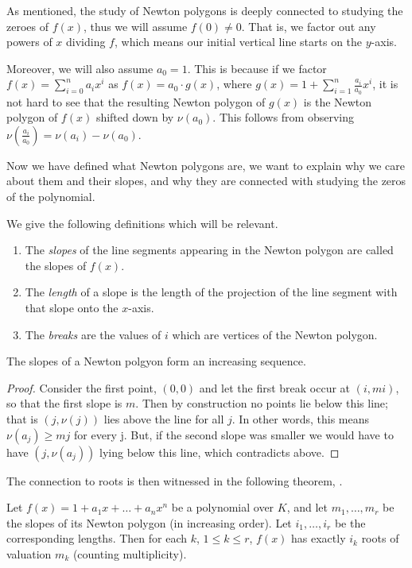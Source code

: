 As mentioned, the study of Newton polygons is deeply connected to studying the zeroes of $f(x)$,
thus we will assume $f(0) \neq 0$. That is, we factor out any powers of $x$ dividing $f$, which
means our initial vertical line starts on the $y$-axis.

Moreover, we will also assume $a_0 = 1$. This is because if we factor
$f(x) = \sum_{i = 0}^n a_i x^i$ as $f(x) = a_0 \cdot g(x)$, where
$ g(x) = 1 + \sum_{i=1}^n \frac{a_i}{a_0}x^i$, it is not hard to see that the resulting Newton
polygon of $g(x)$ is the Newton polygon of $f(x)$ shifted down by $\nu (a_0)$.
This follows from observing $\nu (\frac{a_i}{a_0}) = \nu(a_i) - \nu (a_0)$.

Now we have defined what Newton polygons are, we want to explain why we care about them and their
slopes, and why they are connected with studying the zeros of the polynomial.

We give the following definitions which will be relevant.
\begin{defn}
    \begin{enumerate}
        \item The \emph{slopes} of the line segments appearing in the Newton polygon are called the
        slopes of $f(x)$.
        \item The \emph{length} of a slope is the length of the projection of the line segment with
        that slope onto the $x$-axis.
        \item The \emph{breaks} are the values of $i$ which are vertices of the Newton polygon.
    \end{enumerate}
\end{defn}

\begin{theorem}
  The slopes of a Newton polgyon form an increasing sequence.
\end{theorem}

\begin{proof}
    Consider the first point, $(0,0)$ and let the first break occur at $(i,m i)$, so
    that the first slope is $m$. Then by construction no points lie below this line; that is
    $(j, \nu(j))$ lies above the line for all $j$. In other words, this means $\nu (a_j) \geq m j$
    for every j. But, if the second slope was smaller we would have to have $(j, \nu(a_j))$ lying
    below this line, which contradicts above.
\end{proof}

The connection to roots is then witnessed in the following theorem, \cite[Theorem~7.4.7]{Gouvea}.
\begin{thm}
    \label{NPPoly}
    Let $f(x) = 1 + a_1 x + \dots + a_nx^n$ be a polynomial over $K$, and let $m_1, \dots, m_r$ be
    the slopes of its Newton polygon (in increasing order). Let $i_1, \dots, i_r$ be the
    corresponding lengths. Then for each $k$, $1 \leq k \leq r$, $f(x)$ has exactly $i_k$ roots of
    valuation $m_k$ (counting multiplicity).
\end{thm}

